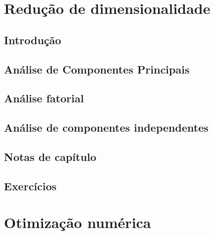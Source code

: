 \documentclass[
]{latex/krantz}
\theoremstyle{definition}
\theoremstyle{definition}
\theoremstyle{definition}
\theoremstyle{definition}
\theoremstyle{remark}
\begin{document}
\hypertarget{reduuxe7uxe3o-de-dimensionalidade}{%
\chapter{Redução de dimensionalidade}\label{reduuxe7uxe3o-de-dimensionalidade}}

\hypertarget{introduuxe7uxe3o-12}{%
\section{Introdução}\label{introduuxe7uxe3o-12}}

\hypertarget{anuxe1lise-de-componentes-principais}{%
\section{Análise de Componentes Principais}\label{anuxe1lise-de-componentes-principais}}

\hypertarget{anuxe1lise-fatorial}{%
\section{Análise fatorial}\label{anuxe1lise-fatorial}}

\hypertarget{anuxe1lise-de-componentes-independentes}{%
\section{Análise de componentes independentes}\label{anuxe1lise-de-componentes-independentes}}

\hypertarget{notas-de-capuxedtulo-12}{%
\section{Notas de capítulo}\label{notas-de-capuxedtulo-12}}

\hypertarget{exercuxedcios-12}{%
\section{Exercícios}\label{exercuxedcios-12}}

\hypertarget{appendix-apuxeandices}{%
\appendix {}}


\hypertarget{otimizauxe7uxe3o-numuxe9rica}{%
\chapter{Otimização numérica}\label{otimizauxe7uxe3o-numuxe9rica}}
\end{document}
